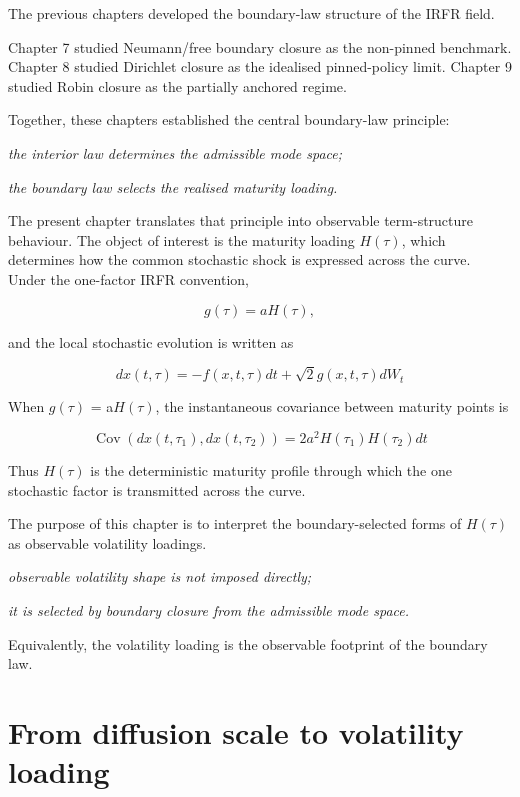 \documentclass[11pt,oneside]{book}
\begin{document}
The previous chapters developed the boundary-law structure of the IRFR
field.

Chapter 7 studied Neumann/free boundary closure as the non-pinned
benchmark. Chapter 8 studied Dirichlet closure as the idealised
pinned-policy limit. Chapter 9 studied Robin closure as the partially
anchored regime.

Together, these chapters established the central boundary-law principle:

\begin{center}\emph{the interior law determines the admissible mode space;}\end{center}
\begin{center}\emph{the boundary law selects the realised maturity loading.}\end{center}
The present chapter translates that principle into observable
term-structure behaviour. The object of interest is the maturity loading
$H(\tau)$, which determines how the common stochastic shock is expressed
across the curve. Under the one-factor IRFR convention,

\[
g(\tau) = aH(\tau),
\]

and the local stochastic evolution is written as

\[
dx(t,\tau)=-f(x,t,\tau)dt+\sqrt{2} g(x,t,\tau)dW_t
\]

When $g(\tau)$ = a$H(\tau)$, the instantaneous covariance between maturity points
is

\[
\operatorname{Cov}(dx(t,\tau_1),dx(t,\tau_2))=2a^2H(\tau_1)H(\tau_2)dt
\]

Thus $H(\tau)$ is the deterministic maturity profile through which the one
stochastic factor is transmitted across the curve.

The purpose of this chapter is to interpret the boundary-selected forms
of $H(\tau)$ as observable volatility loadings.

\begin{center}\emph{observable volatility shape is not imposed directly;}\end{center}
\emph{it is selected by boundary closure from the admissible mode
space.}

Equivalently, the volatility loading is the observable footprint of the
boundary law.

\section{From diffusion scale to volatility
loading}\label{from-diffusion-scale-to-volatility-loading}
\end{document}
